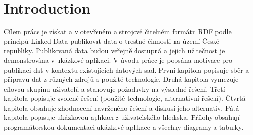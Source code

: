 \chapter*{Introduction}

Cílem práce je získat a v otevřeném a strojově čitelném formátu RDF podle principů Linked Data publikovat data o trestné činnosti na území České republiky.
Publikovaná data budou veřejně dostupná a jejich užitečnost je demonstrována v ukázkové aplikaci.
V úvodu práce je popsána motivace pro publikaci dat v kontextu existujících datových sad.
První kapitola popisuje sběr a přípravu dat z různých zdrojů a použité technologie.
Druhá kapitola vymezuje cílovou skupinu uživatelů a stanovuje požadavky na výsledné řešení.
Třetí kapitola popisuje zvolené řešení (použité technologie, alternativní řešení).
Čtvrtá kapitola obsahuje zhodnocení navrženého řešení a diskusi jeho alternativ.
Pátá kapitola popisuje ukázkovou aplikaci z uživatelského hlediska.
Přílohy obsahují programátorskou dokumentaci ukázkové aplikace a všechny diagramy a tabulky.